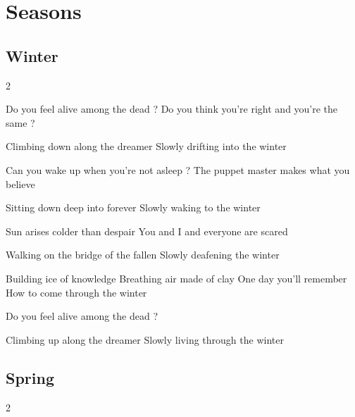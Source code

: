 \documentclass{article}
\newenvironment{album}[1]%
{%
  \section*{#1}
}%
{%
}
\newenvironment{song}[1]%
{%
  \subsection*{\textbf{#1}}
  \begin{multicols*}{2}
}%
{%
  \end{multicols*}
  \newpage
}
\newenvironment{couplet} %
{%
  \verbatim
}%
{% end code
  \endverbatim
}
\newenvironment{refrain} %
{%
  \verbatim
}%
{% end code
  \endverbatim
}
\newenvironment{pont} %
{%
  \verbatim
}%
{% end code
  \endverbatim
}
\begin{document}
\begin{album}{Seasons}

\begin{song}{Winter}
\begin{couplet}
Do you feel alive among the dead ?
Do you think you're right and you're the same ?
\end{couplet}
\begin{refrain}
Climbing down along the dreamer
Slowly drifting into the winter
\end{refrain}
\begin{couplet}
Can you wake up when you're not asleep ?
The puppet master makes what you believe  
\end{couplet}
\begin{refrain}
Sitting down deep into forever
Slowly waking to the winter   
\end{refrain}
\begin{couplet}
Sun arises colder than despair
You and I and everyone are scared  
\end{couplet}
\begin{refrain}
Walking on the bridge of the fallen
Slowly deafening the winter  
\end{refrain}
\begin{pont}
Building ice of knowledge
Breathing air made of clay
One day you'll remember
How to come through the winter
\end{pont}
\begin{couplet}
Do you feel alive among the dead ?
\end{couplet}
\begin{refrain}
Climbing up along the dreamer
Slowly living through the winter    
\end{refrain}

\end{song}

\begin{song}{Spring}


\end{song}
\end{album}
\end{document}
